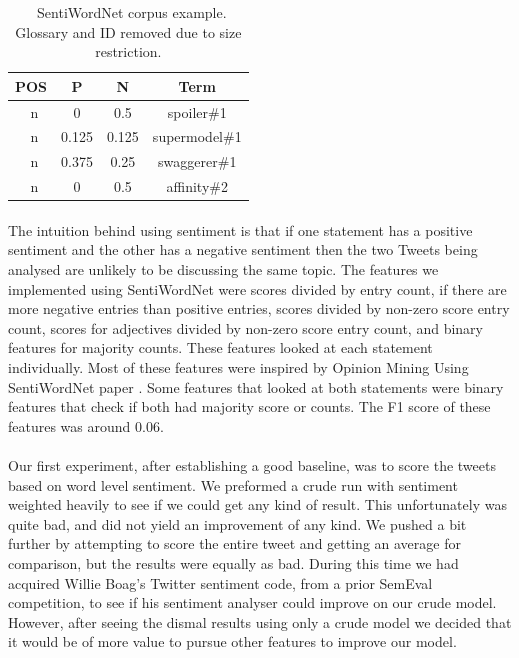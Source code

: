 \documentclass[11pt,letterpaper]{article}
\begin{document}
\begin{table}
\begin{center}
\begin{tabularx}{183pt}{|c|c|c|c|}
\hline
\bf POS & \bf P & \bf N & \bf Term \\ 
\hline
\ n & 0 & 0.5 & spoiler\#1 \\
\ n & 0.125 & 0.125 & supermodel\#1 \\
\ n & 0.375 & 0.25 & swaggerer\#1 \\
\ n & 0 & 0.5 & affinity\#2 \\
\hline
\end{tabularx}
\end{center}
\caption{\label{sentiword-table} ~SentiWordNet corpus example. Glossary and ID removed due to size restriction. }
\end{table}

\paragraph{}
The intuition behind using sentiment is that if one statement has a positive sentiment and the other has a negative sentiment then the two Tweets being analysed are unlikely to be discussing the same topic. The features we implemented using SentiWordNet were scores divided by entry count, if there are more negative entries than positive entries, scores divided by non-zero score entry count, scores for adjectives divided by non-zero score entry count, and binary features for majority counts. These features looked at each statement individually. Most of these features were inspired by Opinion Mining Using SentiWordNet paper \cite{Paraphrase-Identification}.
Some features that looked at both statements were binary features that check if both had majority score or counts. The F1 score of these features was around 0.06.

\paragraph{}
Our first experiment, after establishing a good baseline, was to score the tweets based on word level sentiment. We preformed a crude run with sentiment weighted heavily to see if we could get any kind of result. This unfortunately was quite bad, and did not yield an improvement of any kind. We pushed a bit further by attempting to score the entire tweet and getting an average for comparison, but the results were equally as bad. During this time we had acquired Willie Boag's Twitter sentiment code, from a prior SemEval competition, to see if his sentiment analyser could improve on our crude model. However, after seeing the dismal results using only a crude model we decided that it would be of more value to pursue other features to improve our model.
\end{document}

